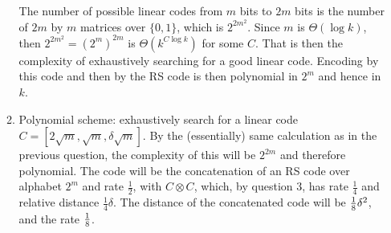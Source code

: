 \documentclass[11pt]{article} \usepackage{amssymb}
\newcommand{\half}{{\textstyle \frac12}}
\newcommand{\fourth}{{\textstyle \frac14}}
\begin{document}
\begin{enumerate}
\begin{enumerate}
The number of possible linear codes from $m$ bits to $2m$ bits is
the number of $2m$ by $m$ matrices over $\{0,1\}$, which is $2^{2m^2}$. Since 
$m$ is $\Theta(\log k)$, then $2^{2m^2}=\left(2^{m}\right)^{2m}$ is $\Theta(k^{C\log k})$ for some $C$. That
is then the complexity of exhaustively searching for a good
linear code. Encoding by this code and then by the RS code is then
polynomial in $2^m$ and hence in $k$.
\item
Polynomial scheme: exhaustively search for a 
linear code $C=[2\sqrt{m},\sqrt{m},\delta \sqrt{m}]$. By the (essentially) same calculation
as in the previous question, the complexity of this will be $2^{2m}$ 
and therefore polynomial. 
The code will be the concatenation of an RS code over alphabet $2^m$ and rate
$\half$, with 
$C\otimes C$, which, by question 3, has rate $\fourth$ and relative 
distance $\fourth\delta$. The distance of the concatenated code 
will be ${1\over 8}\delta^2$, and the rate ${1\over 8}$.
\end{enumerate}

\end{enumerate}
\end{document}
